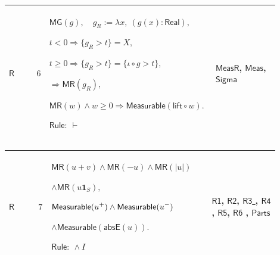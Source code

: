\documentclass[12pt,reqno]{amsart}
\theoremstyle{blueplain}
\numberwithin{equation}{section}
\begin{document}
{\scriptsize \setlength{\parskip}{0pt}\nointerlineskip
\noindent 
\begin{tabular}{|@{}>{\centering\arraybackslash}m{0.10658\linewidth}|>{\centering\arraybackslash}m{0.03553\linewidth}|>{\centering\arraybackslash}m{0.52105\linewidth}|>{\centering\arraybackslash}m{0.23684\linewidth}|}
\hline
\hypertarget{dct:R6}{$\displaystyle \mathsf{R}$} & $\displaystyle 6$ & $%
\displaystyle \mathsf{MG}(g),\quad g_R:=\lambda x,\ (g(x):\mathsf{Real}),$%
\par$\displaystyle t<0\Rightarrow\{g_R>t\}=X,$\par$\displaystyle %
t\ge0\Rightarrow\{g_R>t\}=\{\iota\circ g>t\},$\par$\displaystyle \Rightarrow%
\mathsf{MR}(g_R),$\par$\displaystyle \mathsf{MR}(w)\land w\ge0\Rightarrow%
\mathsf{Measurable}(\mathsf{lift}\circ w).$\par$\displaystyle \mathsf{Rule}%
:\ \vdash$ & \hyperlink{dctdef:MeasR}{$\displaystyle \mathsf{MeasR}$}, 
\hyperlink{def:Meas}{$\displaystyle \mathsf{Meas}$}, \hyperlink{ax:Sigma}{$%
\displaystyle \mathsf{Sigma}$} \\ \hline
\end{tabular}%
}

{\scriptsize \setlength{\parskip}{0pt}\nointerlineskip
\noindent 
\begin{tabular}{|@{}>{\centering\arraybackslash}m{0.10658\linewidth}|>{\centering\arraybackslash}m{0.03553\linewidth}|>{\centering\arraybackslash}m{0.52105\linewidth}|>{\centering\arraybackslash}m{0.23684\linewidth}|}
\hline
\hypertarget{dct:R7}{$\displaystyle \mathsf{R}$} & $\displaystyle 7$ & $%
\displaystyle \mathsf{MR}(u+v)\land\mathsf{MR}(-u)\land\mathsf{MR}(|u|)$\par$%
\displaystyle \land\mathsf{MR}(u\mathbf{1}_S),$\par$\displaystyle \mathsf{%
Measurable}(u^+)\land\mathsf{Measurable}(u^-)$\par$\displaystyle \land%
\mathsf{Measurable}(\mathsf{absE}(u)).$\par$\displaystyle \mathsf{Rule}:\
\land I$ & \hyperlink{dct:R1}{$\displaystyle \mathsf{R1}$}, \hyperlink{dct:R2}%
{$\displaystyle \mathsf{R2}$}, \hyperlink{dct:R3}{$\displaystyle \mathsf{R3}$%
}, \hyperlink{dct:R4}{$\displaystyle \mathsf{R4}$}, \hyperlink{dct:R5}{$%
\displaystyle \mathsf{R5}$}, \hyperlink{dct:R6}{$\displaystyle \mathsf{R6}$}%
, \hyperlink{dctdef:Parts}{$\displaystyle \mathsf{Parts}$} \\ \hline
\end{tabular}%
}
\end{document}
